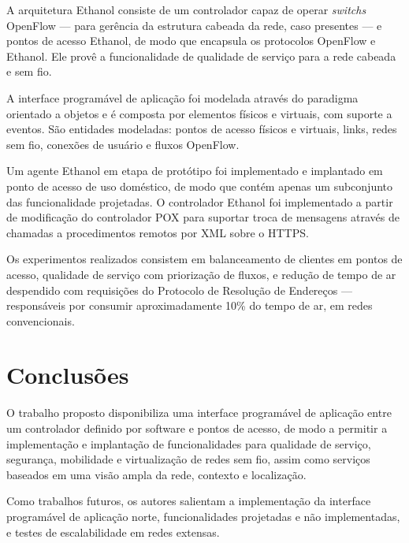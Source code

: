 A arquitetura Ethanol consiste de um controlador capaz de operar \textit{switchs} OpenFlow --- para gerência da estrutura cabeada da rede, caso presentes --- e pontos de acesso Ethanol, de modo que encapsula os protocolos OpenFlow e Ethanol. Ele provê a funcionalidade de qualidade de serviço para a rede cabeada e sem fio.

A interface programável de aplicação foi modelada através do paradigma orientado a objetos e é composta por elementos físicos e virtuais, com suporte a eventos. São entidades modeladas: pontos de acesso físicos e virtuais, links, redes sem fio, conexões de usuário e fluxos OpenFlow.

Um agente Ethanol em etapa de protótipo foi implementado e implantado em ponto de acesso de uso doméstico, de modo que contém apenas um subconjunto das funcionalidade projetadas. O controlador Ethanol foi implementado a partir de modificação do controlador POX para suportar troca de mensagens através de chamadas a procedimentos remotos por XML sobre o HTTPS.

Os experimentos realizados consistem em balanceamento de clientes em pontos de acesso, qualidade de serviço com priorização de fluxos, e redução de tempo de ar despendido com requisições do Protocolo de Resolução de Endereços --- responsáveis por consumir aproximadamente 10\% do tempo de ar, em redes convencionais.


\section*{Conclusões}

O trabalho proposto disponibiliza uma interface programável de aplicação entre um controlador definido por software e pontos de acesso, de modo a permitir a implementação e implantação de funcionalidades para qualidade de serviço, segurança, mobilidade e virtualização de redes sem fio, assim como serviços baseados em uma visão ampla da rede, contexto e localização.

Como trabalhos futuros, os autores salientam a implementação da interface programável de aplicação norte, funcionalidades projetadas e não implementadas, e testes de escalabilidade em redes extensas.
